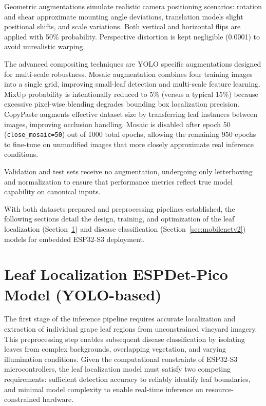 Geometric augmentations simulate realistic camera positioning scenarios: rotation and shear approximate mounting angle deviations, translation models slight positional shifts, and scale variations. Both vertical and horizontal flips are applied with 50\% probability. Perspective distortion is kept negligible (0.0001) to avoid unrealistic warping.

The advanced compositing techniques are YOLO specific augmentations designed for multi-scale robustness. Mosaic augmentation combines four training images into a single grid, improving small-leaf detection and multi-scale feature learning. MixUp probability is intentionally reduced to 5\% (versus a typical 15\%) because excessive pixel-wise blending degrades bounding box localization precision. CopyPaste augments effective dataset size by transferring leaf instances between images, improving occlusion handling. Mosaic is disabled after epoch 50 (\texttt{close\_mosaic=50}) out of 1000 total epochs, allowing the remaining 950 epochs to fine-tune on unmodified images that more closely approximate real inference conditions.

Validation and test sets receive no augmentation, undergoing only letterboxing and normalization to ensure that performance metrics reflect true model capability on canonical inputs.

\vspace{2mm}
\noindent
With both datasets prepared and preprocessing pipelines established, the following sections detail the design, training, and optimization of the leaf localization (Section~\ref{sec:espdet_pico}) and disease classification (Section~\ref{sec:mobilenetv2}) models for embedded ESP32-S3 deployment.




\section{Leaf Localization ESPDet-Pico Model (YOLO-based)}
\label{sec:espdet_pico}


The first stage of the inference pipeline requires accurate localization and extraction of individual grape leaf regions from unconstrained vineyard imagery. This preprocessing step enables subsequent disease classification by isolating leaves from complex backgrounds, overlapping vegetation, and varying illumination conditions. Given the computational constraints of ESP32-S3 microcontrollers, the leaf localization model must satisfy two competing requirements: sufficient detection accuracy to reliably identify leaf boundaries, and minimal model complexity to enable real-time inference on resource-constrained hardware.

